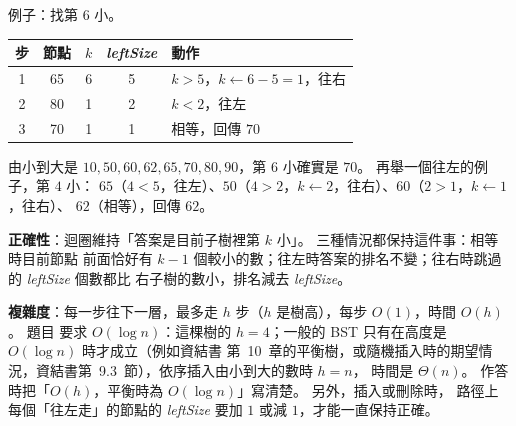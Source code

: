 \begin{pastsoln}
例子：找第 $6$ 小。

\begin{center}
\begin{tabular}{ccccl}
\toprule
步 & 節點 & $k$ & \textit{leftSize} & 動作 \\
\midrule
1 & 65 & 6 & 5 & $k > 5$，$k \gets 6 - 5 = 1$，往右 \\
2 & 80 & 1 & 2 & $k < 2$，往左 \\
3 & 70 & 1 & 1 & 相等，回傳 $70$ \\
\bottomrule
\end{tabular}
\end{center}

由小到大是 $10, 50, 60, 62, 65, 70, 80, 90$，第 $6$ 小確實是 $70$。 再舉一個往左的例子，第 $4$ 小：
$65$（$4 < 5$，往左）、$50$（$4 > 2$，$k \gets 2$，往右）、$60$（$2 > 1$，$k \gets 1$，往右）、
$62$（相等），回傳 $62$。

\textbf{正確性}：迴圈維持「答案是目前子樹裡第 $k$ 小」。 三種情況都保持這件事：相等時目前節點
前面恰好有 $k - 1$ 個較小的數；往左時答案的排名不變；往右時跳過的 \textit{leftSize} 個數都比
右子樹的數小，排名減去 \textit{leftSize}。

\textbf{複雜度}：每一步往下一層，最多走 $h$ 步（$h$ 是樹高），每步 $O(1)$，時間 $O(h)$。 題目
要求 $O(\log n)$：這棵樹的 $h = 4$；一般的 BST 只有在高度是 $O(\log n)$ 時才成立（例如資結書
第~10~章的平衡樹，或隨機插入時的期望情況，資結書第~9.3~節），依序插入由小到大的數時 $h = n$，
時間是 $\Theta(n)$。 作答時把「$O(h)$，平衡時為 $O(\log n)$」寫清楚。 另外，插入或刪除時，
路徑上每個「往左走」的節點的 \textit{leftSize} 要加 $1$ 或減 $1$，才能一直保持正確。
\end{pastsoln}
